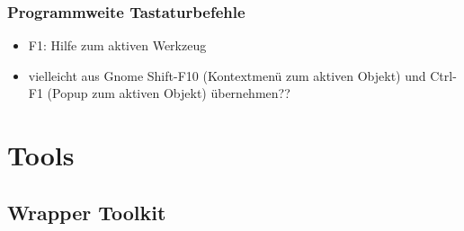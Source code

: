 \documentclass[12pt]{book}
\begin{document}
\subsection{Programmweite Tastaturbefehle}

\begin{itemize}
\item F1: Hilfe zum aktiven Werkzeug
\end{itemize}


\begin{itemize}
\item vielleicht aus Gnome Shift-F10 (Kontextmenü zum aktiven Objekt) und Ctrl-F1 (Popup zum aktiven Objekt) übernehmen??
\end{itemize}








%
%
%
%
%
\chapter{Tools}

\section{Wrapper Toolkit}
\section{}



  
  
\end{document}

